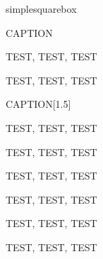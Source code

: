simplesquarebox

\begin{simplesquarebox}{CAPTION}

TEST, TEST, TEST

\end{simplesquarebox}

\begin{simplesquarebox}{}

TEST, TEST, TEST

\end{simplesquarebox}


\begin{simplesquarebox}{CAPTION}[1.5]

TEST, TEST, TEST

\end{simplesquarebox}



\begin{reviewnote}

TEST, TEST, TEST

\end{reviewnote}

\begin{reviewnote}[CAPTION]

TEST, TEST, TEST

\end{reviewnote}

\begin{reviewcaution}[CAPTION]

TEST, TEST, TEST

\end{reviewcaution}

\begin{reviewcaution}

TEST, TEST, TEST

\end{reviewcaution}

\begin{reviewnote}[CAPTION]

TEST, TEST, TEST

\end{reviewnote}


